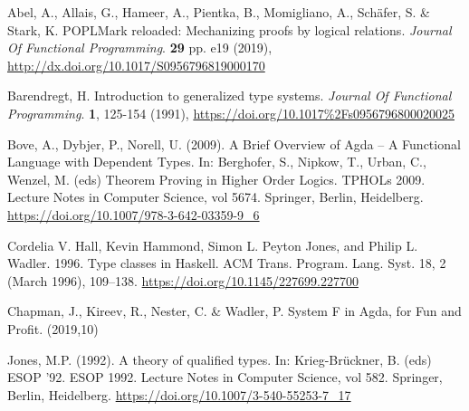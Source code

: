 
Abel, A., Allais, G., Hameer, A., Pientka, B., Momigliano, A., Schäfer, S. \& Stark, K. POPLMark reloaded: Mechanizing proofs by logical relations. {\em Journal Of Functional Programming}. \textbf{29} pp. e19 (2019), \url{http://dx.doi.org/10.1017/S0956796819000170}

 Barendregt, H. Introduction to generalized type systems. {\em Journal Of Functional Programming}. \textbf{1}, 125-154 (1991), \url{https://doi.org/10.1017%2Fs0956796800020025}

 Bove, A., Dybjer, P., Norell, U. (2009). A Brief Overview of Agda – A Functional Language with Dependent Types. In: Berghofer, S., Nipkow, T., Urban, C., Wenzel, M. (eds) Theorem Proving in Higher Order Logics. TPHOLs 2009. Lecture Notes in Computer Science, vol 5674. Springer, Berlin, Heidelberg. \url{https://doi.org/10.1007/978-3-642-03359-9_6}

 Cordelia V. Hall, Kevin Hammond, Simon L. Peyton Jones, and Philip L. Wadler. 1996. Type classes in Haskell. ACM Trans. Program. Lang. Syst. 18, 2 (March 1996), 109–138. \url{https://doi.org/10.1145/227699.227700}

 Chapman, J., Kireev, R., Nester, C. \& Wadler, P. System F in Agda, for Fun and Profit.  (2019,10)

 Jones, M.P. (1992). A theory of qualified types. In: Krieg-Brückner, B. (eds) ESOP '92. ESOP 1992. Lecture Notes in Computer Science, vol 582. Springer, Berlin, Heidelberg. \url{https://doi.org/10.1007/3-540-55253-7_17}

